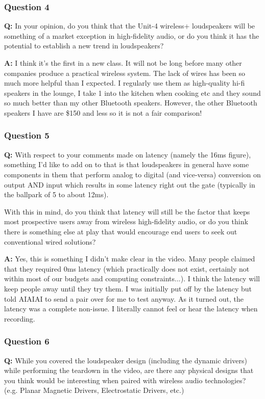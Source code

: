 \documentclass[conference]{IEEEtran}
\begin{document}
\subsubsection*{Question 4}
\textbf{Q:} In your opinion, do you think that the Unit-4 wireless+ loudspeakers will be
something of a market exception in high-fidelity audio, or do you think it has the potential
to establish a new trend in loudspeakers?

\textbf{A:}  I think it's the first in a new class. It will not be long before many other
companies produce a practical wireless system. The lack of wires has been so much more
helpful than I expected. I regularly use them as high-quality hi-fi speakers in the lounge, I
take 1 into the kitchen when cooking etc and they sound so much better than my other
Bluetooth speakers. However, the other Bluetooth speakers I have are \$150 and less so it is
not a fair comparison! \cite{wynne_interviewing_2023}

\subsubsection*{Question 5}
\textbf{Q:} With respect to your comments made on latency (namely the 16ms figure), something
I'd like to add on to that is that loudspeakers in general have some components in them that
perform analog to digital (and vice-versa) conversion on output AND input which results in
some latency right out the gate (typically in the ballpark of 5 to about 12ms).

With this in mind, do you think that latency will still be the factor that keeps most
prospective users away from wireless high-fidelity audio, or do you think there is something
else at play that would encourage end users to seek out conventional wired solutions?

\textbf{A:} Yes, this is something I didn't make clear in the video. Many people claimed that
they required 0ms latency (which practically does not exist, certainly not within most of our
budgets and computing constraints...). I think the latency will keep people away until they
try them. I was initially put off by the latency but told AIAIAI to send a pair over for me
to test anyway. As it turned out, the latency was a complete non-issue. I literally cannot
feel or hear the latency when recording. \cite{wynne_interviewing_2023}

\subsubsection*{Question 6}
\textbf{Q:} While you covered the loudspeaker design (including the dynamic drivers) while
performing the teardown in the video, are there any physical designs that you think would be
interesting when paired with wireless audio technologies? (e.g. Planar Magnetic Drivers,
Electrostatic Drivers, etc.) \cite{stasiunas_overview_nodate}
\end{document}
